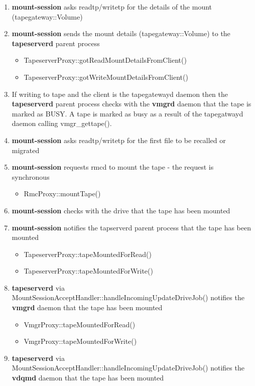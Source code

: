 \begin{enumerate}[noitemsep]
\item \textbf{mount-session} asks readtp/writetp for the details of the mount (tapegateway::Volume)
\item \textbf{mount-session} sends the mount details (tapegateway::Volume) to the \textbf{tapeserverd} parent process
\begin{itemize}
\item        TapeserverProxy::gotReadMountDetailsFromClient()
\item        TapeserverProxy::gotWriteMountDetailsFromClient()
\end{itemize}
\item If writing to tape and the client is the tapegatewayd daemon then the \textbf{tapeserverd} parent process checks with the \textbf{vmgrd} daemon that the tape is marked as BUSY. A tape is marked as busy as a result of the tapegatwayd daemon calling vmgr\_gettape().
\item \textbf{mount-session} asks readtp/writetp for the first file to be recalled or migrated
\item \textbf{mount-session} requests rmcd to mount the tape - the request is synchronous
\begin{itemize}
\item        RmcProxy::mountTape()
\end{itemize}
\item \textbf{mount-session} checks with the drive that the tape has been mounted
\item \textbf{mount-session} notifies the tapserverd parent process that the tape has been mounted
\begin{itemize}
\item        TapeserverProxy::tapeMountedForRead()
\item        TapeserverProxy::tapeMountedForWrite()
\end{itemize}
\item \textbf{tapeserverd} via MountSessionAcceptHandler::handleIncomingUpdateDriveJob() notifies the \textbf{vmgrd} daemon that the tape has been mounted
\begin{itemize}
\item        VmgrProxy::tapeMountedForRead()
\item        VmgrProxy::tapeMountedForWrite()
\end{itemize}
\item \textbf{tapeserverd} via MountSessionAcceptHandler::handleIncomingUpdateDriveJob() notifies the \textbf{vdqmd} daemon that the tape has been mounted
\begin{itemize}

\end{itemize}
\end{enumerate}

